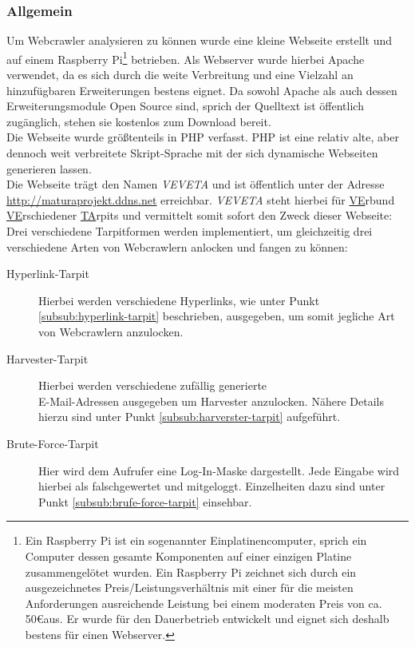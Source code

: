 \subsubsection{Allgemein}
Um Webcrawler analysieren zu können wurde eine kleine Webseite erstellt und auf einem Raspberry Pi\footnote{Ein Raspberry Pi ist ein sogenannter Einplatinencomputer, sprich ein Computer dessen gesamte Komponenten auf einer einzigen Platine zusammengelötet wurden. Ein Raspberry Pi zeichnet sich durch ein ausgezeichnetes Preis/Leistungsverhältnis mit einer für die meisten Anforderungen ausreichende Leistung bei einem moderaten Preis von ca. 50\euro\space aus. Er wurde für den Dauerbetrieb entwickelt und eignet sich deshalb bestens für einen Webserver.} betrieben. Als Webserver wurde hierbei Apache verwendet, da es sich durch die weite Verbreitung und eine Vielzahl an hinzufügbaren Erweiterungen bestens eignet. Da sowohl Apache als auch dessen Erweiterungsmodule Open Source sind, sprich der Quelltext ist öffentlich zugänglich, stehen sie kostenlos zum Download bereit.\\
Die Webseite wurde größtenteils in PHP verfasst. PHP ist eine relativ alte, aber dennoch weit verbreitete Skript-Sprache mit der sich dynamische Webseiten generieren lassen.\\
Die Webseite trägt den Namen \emph{VEVETA} und ist öffentlich unter der Adresse \url{http://maturaprojekt.ddns.net} erreichbar. \emph{VEVETA} steht hierbei für \underline{VE}rbund \underline{VE}rschiedener \underline{TA}rpits und vermittelt somit sofort den Zweck dieser Webseite: Drei verschiedene Tarpitformen werden implementiert, um gleichzeitig drei verschiedene Arten von Webcrawlern anlocken und fangen zu können:
\begin{description}
	\item[Hyperlink-Tarpit] Hierbei werden verschiedene Hyperlinks, wie unter Punkt \ref{subsub:hyperlink-tarpit} beschrieben, ausgegeben, um somit jegliche Art von Webcrawlern anzulocken.
	\item[Harvester-Tarpit] Hierbei werden verschiedene zufällig generierte\\E-Mail-Adressen ausgegeben um Harvester anzulocken. Nähere Details hierzu sind unter Punkt \ref{subsub:harverster-tarpit} aufgeführt.
	\item[Brute-Force-Tarpit] Hier wird dem Aufrufer eine Log-In-Maske dargestellt. Jede Eingabe wird hierbei als \glqq falsch\grqq\space gewertet und mitgeloggt. Einzelheiten dazu sind unter Punkt \ref{subsub:brufe-force-tarpit} einsehbar.
\end{description}
